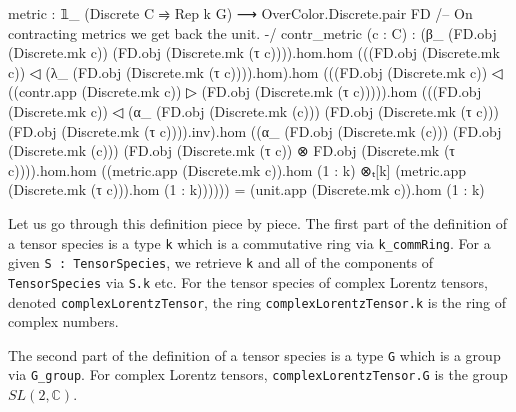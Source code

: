 \documentclass[a4paper, 11pt]{article}
\begin{document}
\begin{codeLong}
  metric : 𝟙_ (Discrete C ⥤ Rep k G) ⟶ OverColor.Discrete.pair FD
  /-- On contracting metrics we get back the unit. -/
  contr_metric (c : C) :
    (β_ (FD.obj (Discrete.mk c)) (FD.obj (Discrete.mk (τ c)))).hom.hom
    (((FD.obj (Discrete.mk c)) ◁ (λ_ (FD.obj (Discrete.mk (τ c)))).hom).hom
    (((FD.obj (Discrete.mk c)) ◁ ((contr.app (Discrete.mk c)) ▷
    (FD.obj (Discrete.mk (τ c))))).hom
    (((FD.obj (Discrete.mk c)) ◁ (α_ (FD.obj (Discrete.mk (c)))
      (FD.obj (Discrete.mk (τ c))) (FD.obj (Discrete.mk (τ c)))).inv).hom
    ((α_ (FD.obj (Discrete.mk (c))) (FD.obj (Discrete.mk (c)))
      (FD.obj (Discrete.mk (τ c)) ⊗ FD.obj (Discrete.mk (τ c)))).hom.hom
    ((metric.app (Discrete.mk c)).hom (1 : k) ⊗ₜ[k]
      (metric.app (Discrete.mk (τ c))).hom (1 : k))))))
    = (unit.app (Discrete.mk c)).hom (1 : k)
\end{codeLong}

Let us go through this definition piece by piece.
The first part of the definition of a tensor species is a type \lstinline|k| 
which is a commutative ring via \lstinline|k_commRing|. 
For a given \lstinline|S : TensorSpecies|, we retrieve \lstinline|k| and all of the 
components of \lstinline|TensorSpecies| via \lstinline|S.k| etc. 
For the tensor species of complex Lorentz tensors, denoted 
\lstinline|complexLorentzTensor|, the ring \lstinline|complexLorentzTensor.k| is the ring of complex numbers.

The second part of the definition of a tensor species is a type \lstinline|G| 
which is a group via \lstinline|G_group|. For complex Lorentz tensors, 
\lstinline|complexLorentzTensor.G| is the group $SL(2, \mathbb{C})$.
\end{document}
